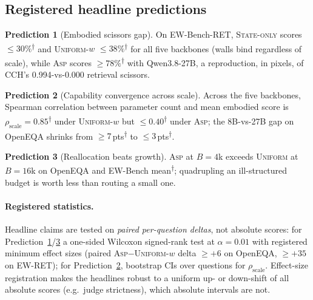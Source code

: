 \documentclass[10pt]{article}
\theoremstyle{definition}
\newtheorem{prediction}{Prediction}
\theoremstyle{plain}
\newcommand{\pred}{\textsuperscript{\textcolor{cpred}{$\dagger$}}}
\newcommand{\ASP}{\textsc{Asp}}
\begin{document}
\subsection{Registered headline predictions}
\begin{prediction}[Embodied scissors gap]\label{prd:scissors}
On EW-Bench-RET, \textsc{State-only} scores $\le 30\%$\pred{} and \textsc{Uniform-}$w$ $\le 38\%$\pred{} for all five backbones (walls bind regardless of scale), while \ASP{} scores $\ge 78\%$\pred{} with Qwen3.8-27B, a reproduction, in pixels, of CCH's 0.994-vs-0.000 retrieval scissors.
\end{prediction}
\begin{prediction}[Capability convergence across scale]\label{prd:conv}
Across the five backbones, Spearman correlation between parameter count and mean embodied score is $\rho_{\mathrm{scale}}=0.85$\pred{} under \textsc{Uniform-}$w$ but $\le 0.40$\pred{} under \ASP{}; the 8B-vs-27B gap on OpenEQA shrinks from $\ge 7$\,pts\pred{} to $\le 3$\,pts\pred{}.
\end{prediction}
\begin{prediction}[Reallocation beats growth]\label{prd:budget}
\ASP{} at $B{=}4$k exceeds \textsc{Uniform} at $B{=}16$k on OpenEQA and EW-Bench mean\pred{}; quadrupling an ill-structured budget is worth less than routing a small one.
\end{prediction}

\paragraph{Registered statistics.} Headline claims are tested on \emph{paired per-question deltas}, not absolute scores: for Prediction~\ref{prd:scissors}/\ref{prd:budget} a one-sided Wilcoxon signed-rank test at $\alpha{=}0.01$ with registered minimum effect sizes (paired \ASP{}$-$\textsc{Uniform-}$w$ delta $\ge{+}6$ on OpenEQA, $\ge{+}35$ on EW-RET); for Prediction~\ref{prd:conv}, bootstrap CIs over questions for $\rho_{\mathrm{scale}}$. Effect-size registration makes the headlines robust to a uniform up- or down-shift of all absolute scores (e.g.\ judge strictness), which absolute intervals are not.
\end{document}
